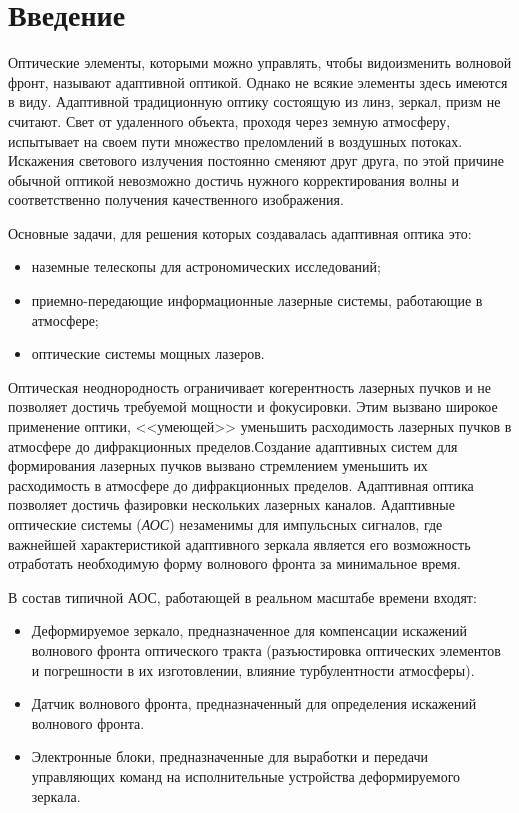 \documentclass[pscyr,titlepage]{hedreport}
\begin{document}
\maketitle
\onehalfspacing

\section*{Введение}

Оптические элементы, которыми можно управлять, чтобы видоизменить волновой
фронт, называют адаптивной оптикой. Однако не всякие элементы здесь имеются в
виду. Адаптивной традиционную оптику состоящую из линз, зеркал, призм не
считают. Свет от удаленного объекта, проходя через земную атмосферу, испытывает
на своем пути множество преломлений в воздушных потоках. Искажения светового
излучения постоянно сменяют друг друга, по этой причине обычной оптикой
невозможно достичь нужного корректирования волны и соответственно получения
качественного изображения.

Основные задачи, для решения которых создавалась адаптивная оптика это:
\begin{itemize}
  \item наземные телескопы для астрономических исследований;
  \item приемно-передающие информационные лазерные системы, работающие в
    атмосфере;
  \item оптические системы мощных лазеров.
\end{itemize}

Оптическая неоднородность ограничивает когерентность лазерных пучков и не
позволяет достичь требуемой мощности и фокусировки. Этим вызвано широкое
применение оптики, <<умеющей>> уменьшить расходимость лазерных пучков в
атмосфере до дифракционных пределов.Создание адаптивных систем для формирования
лазерных пучков вызвано стремлением уменьшить их расходимость в атмосфере до
дифракционных пределов. Адаптивная оптика позволяет достичь фазировки нескольких
лазерных каналов. Адаптивные оптические системы (\emph{АОС}) незаменимы для
импульсных сигналов, где важнейшей характеристикой адаптивного зеркала является
его возможность отработать необходимую форму волнового фронта за минимальное
время.

В состав типичной АОС, работающей в реальном масштабе времени входят:
\begin{itemize}
  \item Деформируемое зеркало, предназначенное для компенсации искажений
    волнового фронта оптического тракта (разъюстировка оптических элементов и
    погрешности в их изготовлении, влияние турбулентности атмосферы).
  \item Датчик волнового фронта, предназначенный для определения искажений
    волнового фронта. 
  \item Электронные блоки, предназначенные для выработки и передачи управляющих
  команд на исполнительные устройства деформируемого зеркала.
\end{itemize}
\end{document}
